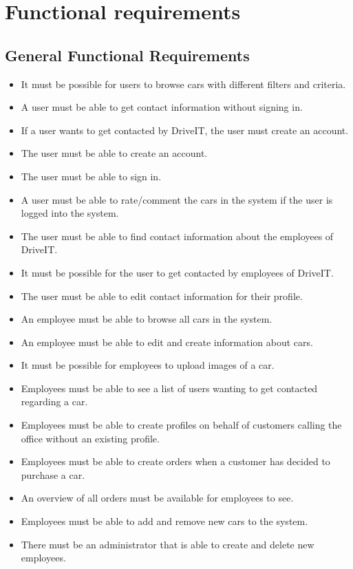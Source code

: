\section{Functional requirements}

\subsection{General Functional Requirements}
\begin{itemize}
    \item It must be possible for users to browse cars with different filters and criteria.
    \item A user must be able to get contact information without signing in.
    \item If a user wants to get contacted by DriveIT, the user must create an account.
    \item The user must be able to create an account.
    \item The user must be able to sign in.
    \item A user must be able to rate/comment the cars in the system if the user is logged into the system.
    \item The user must be able to find contact information about the employees of DriveIT.
    \item It must be possible for the user to get contacted by employees of DriveIT.
    \item The user must be able to edit contact information for their profile.
    \item An employee must be able to browse all cars in the system.
    \item An employee must be able to edit and create information about cars.
    \item It must be possible for employees to upload images of a car.
    \item Employees must be able to see a list of users wanting to get contacted regarding a car.
    \item Employees must be able to create profiles on behalf of customers calling the office without an existing profile.
    \item Employees must be able to create orders when a customer has decided to purchase a car.
    \item An overview of all orders must be available for employees to see.
    \item Employees must be able to add and remove new cars to the system.
    \item There must be an administrator that is able to create and delete new employees.
\end{itemize}

